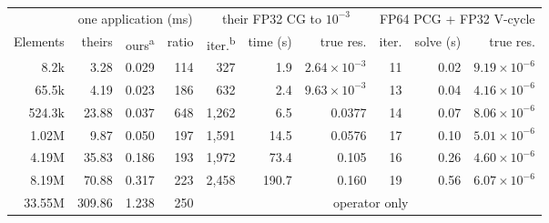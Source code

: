 \begin{tabular}{rrrrrrrrrr}
\toprule
 & \multicolumn{3}{c}{one application (ms)} & \multicolumn{3}{c}{their FP32 CG to $10^{-3}$} & \multicolumn{3}{c}{FP64 PCG + FP32 V-cycle} \\
\cmidrule(lr){2-4}\cmidrule(lr){5-7}\cmidrule(lr){8-10}
Elements & theirs & ours\textsuperscript{a} & ratio & iter.\textsuperscript{b} & time (s) & true res. & iter. & solve (s) & true res. \\
\midrule
8.2k & 3.28 & 0.029 & 114 & 327 & 1.9 & $2.64\times10^{-3}$ & 11 & 0.02 & $9.19\times10^{-6}$ \\
65.5k & 4.19 & 0.023 & 186 & 632 & 2.4 & $9.63\times10^{-3}$ & 13 & 0.04 & $4.16\times10^{-6}$ \\
524.3k & 23.88 & 0.037 & 648 & 1{,}262 & 6.5 & 0.0377 & 14 & 0.07 & $8.06\times10^{-6}$ \\
1.02M & 9.87 & 0.050 & 197 & 1{,}591 & 14.5 & 0.0576 & 17 & 0.10 & $5.01\times10^{-6}$ \\
4.19M & 35.83 & 0.186 & 193 & 1{,}972 & 73.4 & 0.105 & 16 & 0.26 & $4.60\times10^{-6}$ \\
8.19M & 70.88 & 0.317 & 223 & 2{,}458 & 190.7 & 0.160 & 19 & 0.56 & $6.07\times10^{-6}$ \\
33.55M & 309.86 & 1.238 & 250 & \multicolumn{6}{c}{operator only} \\
\bottomrule
\end{tabular}
